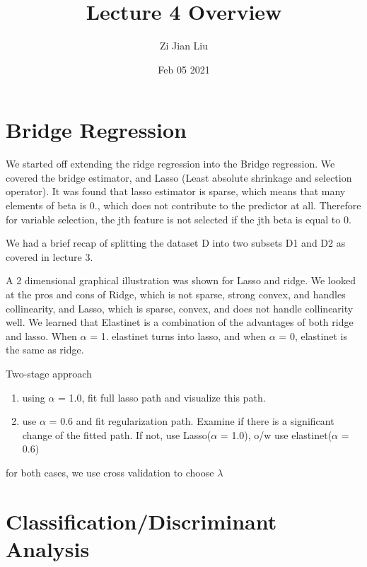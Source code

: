 \documentclass[twoside]{article}
\theoremstyle{definition}
\theoremstyle{definition}
\theoremstyle{remark}
\begin{document}
	\title{Lecture 4 Overview}
	\author{Zi Jian Liu}
	
	\date{Feb 05 2021}
	
	\maketitle
	
	\section*{Bridge Regression}
	
	We started off extending the ridge regression into the Bridge regression. We covered the bridge estimator, and Lasso (Least absolute shrinkage and selection operator). It was found that lasso estimator is sparse, which means that many elements of beta is 0., which does not contribute to the predictor at all. Therefore for variable selection, the jth feature is not selected if the jth beta is equal to 0.
	
	We had a brief recap of splitting the dataset D into two subsets D1 and D2 as covered in lecture 3.
	
	A 2 dimensional graphical illustration was shown for Lasso and ridge. We looked at the pros and cons of Ridge, which is not sparse, strong convex, and handles collinearity, and Lasso, which is sparse, convex, and does not handle collinearity well. We learned that Elastinet is a combination of the advantages of both ridge and lasso. When $\alpha$ = 1. elastinet turns into lasso, and when $\alpha$ = 0, elastinet is the same as ridge.
	
	
	Two-stage approach
	\begin{enumerate}
	
		\item using $\alpha$ = 1.0, fit full lasso path and visualize this path.
	
		\item use $\alpha$ = 0.6 and fit regularization path. Examine if there is a significant change of the fitted path. If not, use Lasso($\alpha$ = 1.0), o/w use elastinet($\alpha$ = 0.6)

	\end{enumerate}
	for both cases, we use cross validation to choose $\lambda$

	\section*{Classification/Discriminant Analysis}
	
\end{document}
